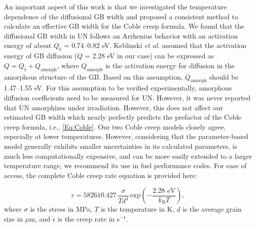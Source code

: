 \documentclass[preprint,12pt,sort&compress]{elsarticle}
\newcommand{\?}{\stackrel{?}{=}}
\begin{document}
An important aspect of this work is that we investigated the temperature dependence of the diffusional GB width and proposed a consistent method to calculate an effective GB width for the Coble creep formula. We found that the diffusional GB width in UN follows an Arrhenius behavior with an activation energy of about $Q_\delta$ = 0.74--0.82 eV. Keblinski \textit{et al.} \cite{Keblinski1999} assumed that the activation energy of GB diffusion ($Q$ = 2.28 eV in our case) can be expressed as $Q = Q_\delta + Q_\mathrm{amorph}$, where $Q_\mathrm{amorph}$ is the activation energy for diffusion in the amorphous structure of the GB. Based on this assumption, $Q_\mathrm{amorph}$ should be 1.47--1.55 eV. For this assumption to be verified experimentally, amorphous diffusion coefficients need to be measured for UN. However, it was never reported that UN amorphizes under irradiation. However, this does not affect our estimated GB width which nearly perfectly predicts the prefactor of the Coble creep formula, i.e., \cref{Eq:Coble}. Our two Coble creep models closely agree, especially at lower temperatures. However, considering that the parameter-based model generally exhibits smaller uncertainties in its calculated parameters, is much less computationally expensive, and can be more easily extended to a larger temperature range, we recommend its use in fuel performance codes. For ease of access, the complete Coble creep rate equation is provided here:

\begin{equation}
    \dot{\epsilon} = 582610.427 \, \frac{\sigma}{T d^3} \, \mathrm{exp} \! \left( - \frac{2.28 \text{ eV}}{k_\mathrm{B} T} \right),
    \label{Eq:OurModel}
\end{equation}
where $\sigma$ is the stress in MPa, $T$ is the temperature in K, $d$ is the average grain size in $\mu$m, and $\Dot{\epsilon}$ is the creep rate in s$^{-1}$. 
\end{document}
